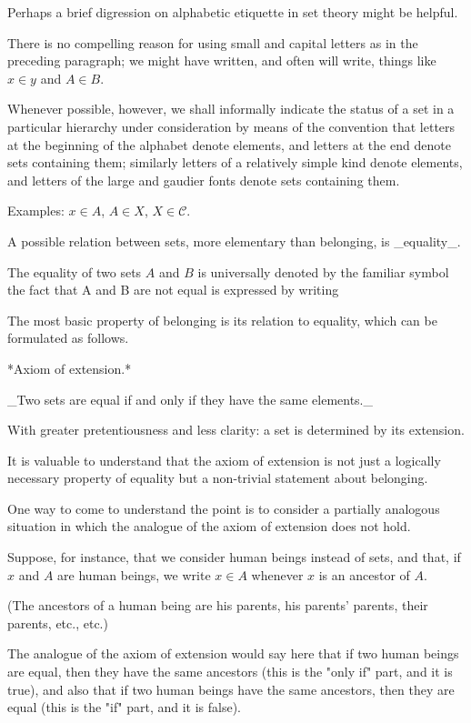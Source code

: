 { %


 Perhaps a brief digression on alphabetic etiquette in set theory might be helpful. 

There is no compelling reason for using small and capital letters as in the preceding paragraph; we might have written, and often will write, things like {$x \in y$} and {$A \in B$}. 

Whenever possible, however, we shall informally indicate the status of a set in a particular hierarchy under consideration by means of the convention that letters at the beginning of the alphabet denote elements, and letters at the end denote sets containing them; similarly letters of a relatively simple kind denote elements, and letters of the large and gaudier fonts denote sets containing them. 

Examples: {$x \in A$}, {$A \in X$}, {$X \in \mathcal{C}$}. 

A possible relation between sets, more elementary than belonging, is _equality_. 

The equality of two sets {$A$} and {$B$} is universally denoted by the familiar symbol  the fact that {A} and {B} are not equal is expressed by writing  

The most basic property of belonging is its relation to equality, which can be formulated as follows.


 *Axiom of extension.* 

_Two sets are equal if and only if they have the same elements._


 With greater pretentiousness and less clarity: a set is determined by its extension. 

It is valuable to understand that the axiom of extension is not just a logically necessary property of equality but a non-trivial statement about belonging. 

One way to come to understand the point is to consider a partially analogous situation in which the analogue of the axiom of extension does not hold. 

Suppose, for instance, that we consider human beings instead of sets, and that, if {$x$} and {$A$} are human beings, we write {$x \in A$} whenever {$x$} is an ancestor of {$A$}. 

(The ancestors of a human being are his parents, his parents' parents, their parents, etc., etc.) 

The analogue of the axiom of extension would say here that if two human beings are equal, then they have the same ancestors (this is the "only if" part, and it is true), and also that if two human beings have the same ancestors, then they are equal (this is the "if" part, and it is false). 

}
